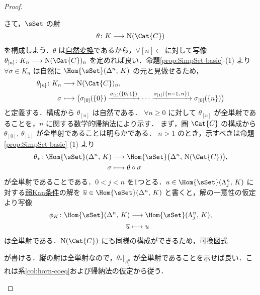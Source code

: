 \documentclass[TQFT_main]{subfiles}
\begin{document}
\begin{proof}
\begin{description}
        さて，$\sSet$ の射
        \begin{align}
            \theta \colon K \lto \mathrm{N}(\Cat{C})
        \end{align}
        を構成しよう．$\theta$ は\hyperref[def:nat]{自然変換}であるから，$\forall [n] \in $ に対して写像 $\theta_{[n]} \colon K_n \lto \mathrm{N}(\Cat{C})_n$ を定めれば良い．命題\ref{prop:SimpSet-basic}-(1) より $\forall \sigma \in K_n$ は自然に $\Hom{\sSet} (\Delta^n,\, K)$ の元と見做せるため，
        \begin{align}
            \theta_{[n]} \colon K_n &\lto \mathrm{N}(\Cat{C})_n, \\
            \sigma &\lmto \bigl( \sigma_{[0]}(\{0\}) \xrightarrow{\sigma_{[1]}(\{0,\, 1\})} \cdots \xrightarrow{\sigma_{[1]}(\{n-1,\, n\})} \sigma_{[0]}(\{n\}) \bigr) 
        \end{align}
        と定義する．構成から $\theta_{[n]}$ は自然である．
        $\forall n \ge 0$ に対して $\theta_{[n]}$ が全単射であることを，$n$ に関する数学的帰納法により示す．
        まず，圏 $\Cat{C}$ の構成から $\theta_{[0]},\, \theta_{[1]}$ が全単射であることは明らかである．
        $n > 1$ のとき，示すべきは命題\ref{prop:SimpSet-basic}-(1) より
        \begin{align}
            \theta_* \colon \Hom{\sSet} (\Delta^n,\, K) &\lto \Hom{\sSet} \bigl(\Delta^n,\, \mathrm{N}(\Cat{C})\bigr), \\
            \sigma &\lmto \theta \circ \sigma
        \end{align}
        が全単射であることである．$0 < j < n$ を1つとる．$u \in \Hom{\sSet} (\Lambda^n_j,\, K)$ に対する\hyperref[def:KanCplx]{弱Kan条件}の解を $\overline{u} \in \Hom{\sSet} (\Delta^n,\, K)$ と書くと，解の一意性の仮定より写像
        \begin{align}
            \phi_K \colon \Hom{\sSet} (\Delta^n,\, K) &\lto \Hom{\sSet} (\Lambda^n_j,\, K), \\
            \overline{u} &\lmto u
        \end{align}
        は全単射である．$\mathrm{N}(\Cat{C})$ にも同様の構成ができるため，可換図式
        \begin{center}
        \end{center}
        が書ける．縦の射は全単射なので，$\theta_*|_{\Lambda^n_j}$ が全単射であることを示せば良い．これは系\ref{col:horn-coeq}および帰納法の仮定から従う．
    \end{description}
    
\end{proof}
\end{document}
